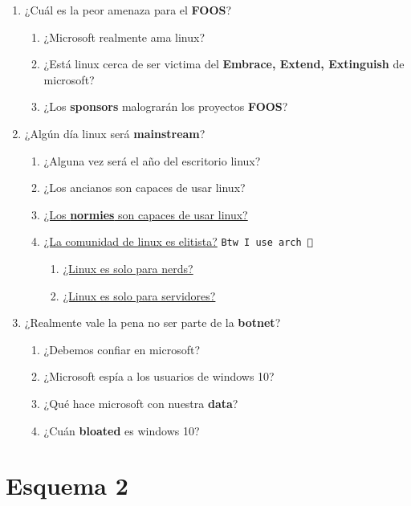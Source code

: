 \documentclass[12pt, twoside]{article}
\begin{document}
\begin{enumerate}
	\item ¿Cuál es la peor amenaza para el \textbf{FOOS}?
		\begin{enumerate}
			\item ¿Microsoft realmente ama linux?
			\item ¿Está linux cerca de ser victima del \textbf{Embrace, Extend, Extinguish} de microsoft?
			\item ¿Los \textbf{sponsors} malograrán los proyectos \textbf{FOOS}?
		\end{enumerate}
	\item ¿Algún día linux será \textbf{mainstream}?
		\begin{enumerate}
			\item ¿Alguna vez será el año del escritorio linux?
			\item ¿Los ancianos son capaces de usar linux?
			\item \underline{¿Los \textbf{normies} son capaces de usar linux?}
			\item \underline{¿La comunidad de linux es elitista?}
				{\tiny\color{arch}\texttt{Btw I use arch  }}
				\begin{enumerate}
					\item \underline{¿Linux es solo para nerds?}
					\item \underline{¿Linux es solo para servidores?}
				\end{enumerate}
		\end{enumerate}
	\item ¿Realmente vale la pena no ser parte de la \textbf{botnet}?
		\begin{enumerate}
			\item ¿Debemos confiar en microsoft?
			\item ¿Microsoft espía a los usuarios de windows 10?
			\item ¿Qué hace microsoft con nuestra \textbf{data}?
			\item ¿Cuán \textbf{bloated} es windows 10?
		\end{enumerate}
\end{enumerate}
\section{Esquema 2}%
\label{sec:Esquema 2}
\end{document}
